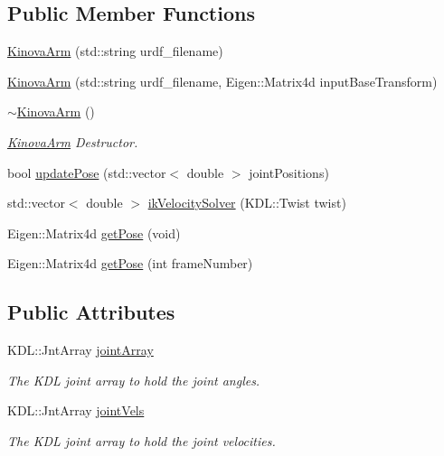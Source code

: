 \subsection*{Public Member Functions}
\begin{DoxyCompactItemize}
\item 
\hyperlink{class_kinova_arm_abbbe90c0d43bf6665d62bdf6c1ef398f}{Kinova\+Arm} (std\+::string urdf\+\_\+filename)
\item 
\hyperlink{class_kinova_arm_a5ca50dcf1c211aea4986bc5a04f37331}{Kinova\+Arm} (std\+::string urdf\+\_\+filename, Eigen\+::\+Matrix4d input\+Base\+Transform)
\item 
\hyperlink{class_kinova_arm_a9d5b485d8137a0b27e98a0c1c4d67861}{$\sim$\+Kinova\+Arm} ()\hypertarget{class_kinova_arm_a9d5b485d8137a0b27e98a0c1c4d67861}{}\label{class_kinova_arm_a9d5b485d8137a0b27e98a0c1c4d67861}

\begin{DoxyCompactList}\small\item\em \hyperlink{class_kinova_arm}{Kinova\+Arm} Destructor. \end{DoxyCompactList}\item 
bool \hyperlink{class_kinova_arm_a3374988c7b3d9ae8773bc63f950629f7}{update\+Pose} (std\+::vector$<$ double $>$ joint\+Positions)
\item 
std\+::vector$<$ double $>$ \hyperlink{class_kinova_arm_a0a5a3bd128b420d58d92d242c075db92}{ik\+Velocity\+Solver} (K\+D\+L\+::\+Twist twist)
\item 
Eigen\+::\+Matrix4d \hyperlink{class_kinova_arm_aea7c01f72eb70387ff71ca130db3bd3f}{get\+Pose} (void)
\item 
Eigen\+::\+Matrix4d \hyperlink{class_kinova_arm_ae6b5c17c1b7b79bc3de00e8d38b80999}{get\+Pose} (int frame\+Number)
\end{DoxyCompactItemize}
\subsection*{Public Attributes}
\begin{DoxyCompactItemize}
\item 
K\+D\+L\+::\+Jnt\+Array \hyperlink{class_kinova_arm_a47ddba255203039c2d7d3ceb48b2c4ac}{joint\+Array}\hypertarget{class_kinova_arm_a47ddba255203039c2d7d3ceb48b2c4ac}{}\label{class_kinova_arm_a47ddba255203039c2d7d3ceb48b2c4ac}

\begin{DoxyCompactList}\small\item\em The K\+DL joint array to hold the joint angles. \end{DoxyCompactList}\item 
K\+D\+L\+::\+Jnt\+Array \hyperlink{class_kinova_arm_adeab92c27d6555029a30f5bcbba8bfab}{joint\+Vels}\hypertarget{class_kinova_arm_adeab92c27d6555029a30f5bcbba8bfab}{}\label{class_kinova_arm_adeab92c27d6555029a30f5bcbba8bfab}

\begin{DoxyCompactList}\small\item\em The K\+DL joint array to hold the joint velocities. \end{DoxyCompactList}\end{DoxyCompactItemize}


